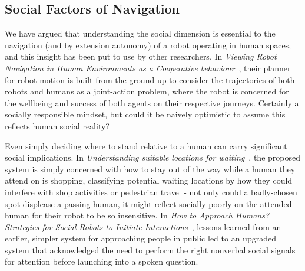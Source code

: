 \documentclass{sfuthesis}
\begin{document}







\subsection{Social Factors of Navigation}	

We have argued that understanding the social dimension is essential to the navigation (and by extension autonomy) of a robot operating in human spaces, and this insight has been put to use by other researchers. In \textit{Viewing Robot Navigation in Human Environments as a Cooperative behaviour}~\cite{khambhaita2017viewing}, their planner for robot motion is built from the ground up to consider the trajectories of both robots and humans as a joint-action problem, where the robot is concerned for the wellbeing and success of both agents on their respective journeys. Certainly a socially responsible mindset, but could it be naively optimistic to assume this reflects human social reality?


Even simply deciding where to stand relative to a human can carry significant social implications. In \textit{Understanding suitable locations for waiting}~\cite{kitade2013understanding}, the proposed system is simply concerned with how to stay out of the way while a human they attend on is shopping, classifying potential waiting locations by how they could interfere with shop activities or pedestrian travel - not only could a badly-chosen spot displease a passing human, it might reflect socially poorly on the attended human for their robot to be so insensitive. In \textit{How to Approach Humans? Strategies for Social Robots to Initiate Interactions}~\cite{satake2009approach}, lessons learned from an earlier, simpler system for approaching people in public led to an upgraded system that acknowledged the need to perform the right nonverbal social signals for attention before launching into a spoken question.
\end{document}

